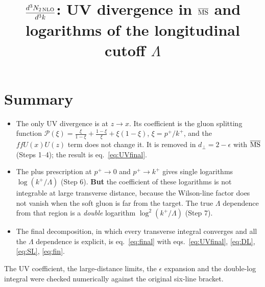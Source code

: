 \documentclass[11pt,a4paper]{article}
\title{$\dfrac{d^3N_{2\,\rm NLO}}{d^3k}$: UV divergence in $\MSbar$ and\\ logarithms of the longitudinal cutoff $\Lambda$}
\author{}
\date{}
\newcommand{\MSbar}{\overline{\rm MS}}
\begin{document}
\maketitle
\vspace{-1.5cm}

\section*{Summary}
\begin{itemize}
\item The only UV divergence is at $z\to x$. Its coefficient is the gluon splitting function
$\mathcal P(\xi)=\frac{\xi}{1-\xi}+\frac{1-\xi}{\xi}+\xi(1-\xi)$, $\xi=p^+/k^+$, and the
$f f U(x)U(z)$ term does not change it. It is removed in $d_\perp=2-\epsilon$ with $\MSbar$
(Steps 1--4); the result is eq.~\eqref{eq:UVfinal}.
\item The plus prescription at $p^+\to0$ and $p^+\to k^+$ gives single logarithms
$\log(k^+/\Lambda)$ (Step 6). \textbf{But} the coefficient of these logarithms is not integrable at
large transverse distance, because the Wilson-line factor does not vanish when the soft gluon is far
from the target. The true $\Lambda$ dependence from that region is a \emph{double} logarithm
$\log^2(k^+/\Lambda)$ (Step 7).
\item The final decomposition, in which every transverse integral converges and all the $\Lambda$
dependence is explicit, is eq.~\eqref{eq:final} with eqs.~\eqref{eq:UVfinal}, \eqref{eq:DL},
\eqref{eq:SL}, \eqref{eq:fin}.
\end{itemize}
The UV coefficient, the large-distance limits, the $\epsilon$ expansion and the double-log integral
were checked numerically against the original six-line bracket.

\end{document}
